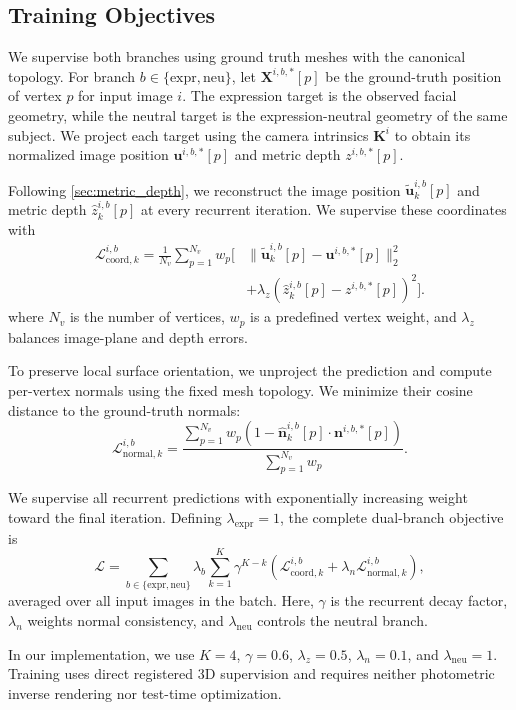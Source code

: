 \subsection{Training Objectives}
\label{sec:training_objectives}

We supervise both branches using ground truth meshes with the canonical
topology. For branch $b\in\{\mathrm{expr},\mathrm{neu}\}$, let
$\mathbf{X}^{i,b,*}[p]$ be the ground-truth position of vertex $p$ for input
image $i$. The expression target is the observed facial geometry, while the
neutral target is the expression-neutral geometry of the same subject. We
project each target using the camera intrinsics $\mathbf{K}^{i}$ to obtain its
normalized image position $\mathbf{u}^{i,b,*}[p]$ and metric depth
$z^{i,b,*}[p]$.

Following \cref{sec:metric_depth}, we reconstruct the image position
$\tilde{\mathbf{u}}_{k}^{i,b}[p]$ and metric depth $\hat z_{k}^{i,b}[p]$ at
every recurrent iteration. We supervise these coordinates with
\begin{equation}
    \begin{aligned}
        \mathcal{L}_{\mathrm{coord},k}^{i,b}
        = \frac{1}{N_v}\sum_{p=1}^{N_v} w_p \big[&
        \|\tilde{\mathbf{u}}_{k}^{i,b}[p]
        -\mathbf{u}^{i,b,*}[p]\|_2^2 \\
        &+ \lambda_z
        (\hat z_{k}^{i,b}[p]-z^{i,b,*}[p])^2 \big].
    \end{aligned}
    \label{eq:coordinate_loss}
\end{equation}
where $N_v$ is the number of vertices, $w_p$ is a predefined vertex weight,
and $\lambda_z$ balances image-plane and depth errors.

To preserve local surface orientation, we unproject the prediction and compute
per-vertex normals using the fixed mesh topology. We minimize their cosine
distance to the ground-truth normals:
\begin{equation}
    \mathcal{L}_{\mathrm{normal},k}^{i,b}
    =
    \frac{
        \sum_{p=1}^{N_v} w_p
        \left(1-
        \hat{\mathbf{n}}_{k}^{i,b}[p]\cdot
        \mathbf{n}^{i,b,*}[p]\right)
    }{
        \sum_{p=1}^{N_v}w_p
    }.
    \label{eq:normal_loss}
\end{equation}

We supervise all recurrent predictions with exponentially increasing weight
toward the final iteration. Defining $\lambda_{\mathrm{expr}}=1$, the complete
dual-branch objective is
\begin{equation}
    \mathcal{L}
    =
    \sum_{b\in\{\mathrm{expr},\mathrm{neu}\}}\lambda_b
    \sum_{k=1}^{K}\gamma^{K-k}
    \left(
        \mathcal{L}_{\mathrm{coord},k}^{i,b}
        +\lambda_n\mathcal{L}_{\mathrm{normal},k}^{i,b}
    \right),
    \label{eq:total_loss}
\end{equation}
averaged over all input images in the batch. Here, $\gamma$ is the recurrent
decay factor, $\lambda_n$ weights normal consistency, and
$\lambda_{\mathrm{neu}}$ controls the neutral branch.

In our implementation, we use $K=4$, $\gamma=0.6$, $\lambda_z=0.5$,
$\lambda_n=0.1$, and $\lambda_{\mathrm{neu}}=1$. Training uses direct
registered 3D supervision and requires neither photometric inverse rendering
nor test-time optimization.
